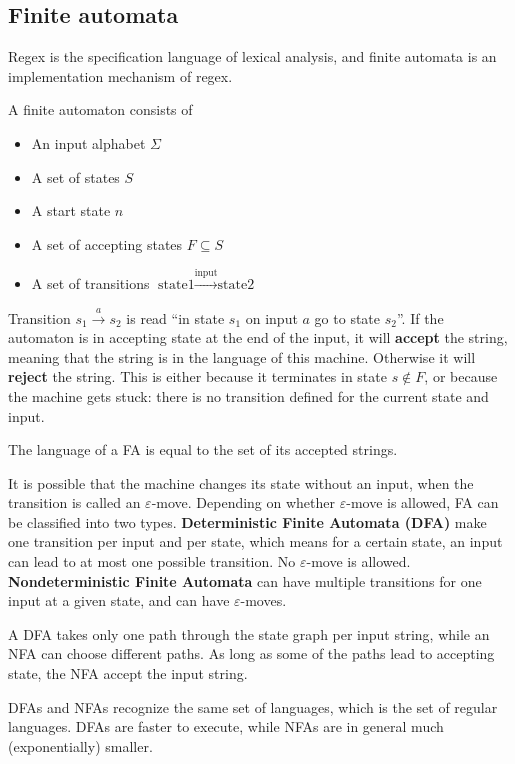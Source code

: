 \subsection{Finite automata}
Regex is the specification language of lexical analysis, and finite automata is an implementation mechanism of regex.

A finite automaton consists of
\begin{itemize}
\item An input alphabet $\Sigma$
\item A set of states $S$
\item A start state $n$
\item A set of accepting states $F\subseteq S$
\item A set of transitions $\text{state1}\xrightarrow{\text{input}}\text{state2}$
\end{itemize}
Transition $s_1\xrightarrow{a}s_2$ is read ``in state $s_1$ on input $a$ go to state $s_2$''. If the automaton is in accepting state at the end of the input, it will {\bf accept} the string, meaning that the string is in the language of this machine. Otherwise it will {\bf reject} the string. This is either because it terminates in state $s\notin F$, or because the machine gets stuck: there is no transition defined for the current state and input.

The language of a FA is equal to the set of its accepted strings.

It is possible that the machine changes its state without an input, when the transition is called an $\varepsilon $-move. Depending on whether $\varepsilon$-move is allowed, FA can be classified into two types. {\bf Deterministic Finite Automata (DFA)} make one transition per input and per state, which means for a certain state, an input can lead to at most one possible transition. No $\varepsilon$-move is allowed. {\bf Nondeterministic Finite Automata} can have multiple transitions for one input at a given state, and can have $\varepsilon$-moves.

A DFA takes only one path through the state graph per input string, while an NFA can choose different paths. As long as some of the paths lead to accepting state, the NFA accept the input string.

DFAs and NFAs recognize the same set of languages, which is the set of regular languages. DFAs are faster to execute, while NFAs are in general much (exponentially) smaller.
